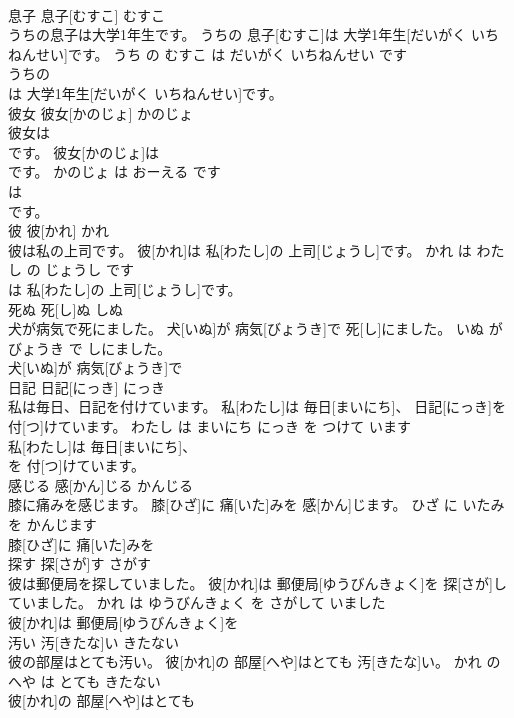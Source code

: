 \documentclass[8pt]{extreport}
\begin{document}
\begin{CJK}{UTF8}{min}
\\	息子	息子[むすこ]	むすこ	
\\	うちの息子は大学1年生です。	うちの 息子[むすこ]は 大学1年生[だいがく いちねんせい]です。	うち の むすこ は だいがく いちねんせい です	
\\	うちの
\\	は 大学1年生[だいがく いちねんせい]です。			
\\	彼女	彼女[かのじょ]	かのじょ	
\\	彼女は
\\	です。	彼女[かのじょ]は 
\\	[おーえる]です。	かのじょ は おーえる です	
\\	は 
\\	[おーえる]です。			
\\	彼	彼[かれ]	かれ	
\\	彼は私の上司です。	彼[かれ]は 私[わたし]の 上司[じょうし]です。	かれ は わたし の じょうし です	
\\	は 私[わたし]の 上司[じょうし]です。			
\\	死ぬ	死[し]ぬ	しぬ	
\\	犬が病気で死にました。	犬[いぬ]が 病気[びょうき]で 死[し]にました。	いぬ が びょうき で しにました。	
\\	犬[いぬ]が 病気[びょうき]で
\\	日記	日記[にっき]	にっき	
\\	私は毎日、日記を付けています。	私[わたし]は 毎日[まいにち]、 日記[にっき]を 付[つ]けています。	わたし は まいにち にっき を つけて います	
\\	私[わたし]は 毎日[まいにち]、
\\	を 付[つ]けています。			
\\	感じる	感[かん]じる	かんじる	
\\	膝に痛みを感じます。	膝[ひざ]に 痛[いた]みを 感[かん]じます。	ひざ に いたみ を かんじます	
\\	膝[ひざ]に 痛[いた]みを
\\	探す	探[さが]す	さがす	
\\	彼は郵便局を探していました。	彼[かれ]は 郵便局[ゆうびんきょく]を 探[さが]していました。	かれ は ゆうびんきょく を さがして いました	
\\	彼[かれ]は 郵便局[ゆうびんきょく]を
\\	汚い	汚[きたな]い	きたない	
\\	彼の部屋はとても汚い。	彼[かれ]の 部屋[へや]はとても 汚[きたな]い。	かれ の へや は とても きたない	
\\	彼[かれ]の 部屋[へや]はとても

\end{CJK}
\end{document}
